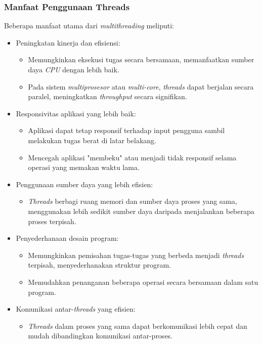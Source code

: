 \documentclass[12pt]{article}
\begin{document}
\subsubsection{Manfaat Penggunaan Threads}
Beberapa manfaat utama dari \textit{multithreading} meliputi:
\begin{itemize}
    \item Peningkatan kinerja dan efisiensi:
    \begin{itemize}
        \item Memungkinkan eksekusi tugas secara bersamaan, memanfaatkan sumber daya \textit{CPU} dengan lebih baik.
        \item Pada sistem \textit{multiprosesor} atau \textit{multi-core}, \textit{threads} dapat berjalan secara paralel, meningkatkan \textit{throughput} secara signifikan.
    \end{itemize}
    
    \item Responsivitas aplikasi yang lebih baik:
    \begin{itemize}
        \item Aplikasi dapat tetap responsif terhadap input pengguna sambil melakukan tugas berat di latar belakang.
        \item Mencegah aplikasi "membeku" atau menjadi tidak responsif selama operasi yang memakan waktu lama.
    \end{itemize}
    
    \item Penggunaan sumber daya yang lebih efisien:
    \begin{itemize}
        \item \textit{Threads} berbagi ruang memori dan sumber daya proses yang sama, menggunakan lebih sedikit sumber daya daripada menjalankan beberapa proses terpisah.
    \end{itemize}
    
    \item Penyederhanaan desain program:
    \begin{itemize}
        \item Memungkinkan pemisahan tugas-tugas yang berbeda menjadi \textit{threads} terpisah, menyederhanakan struktur program.
        \item Memudahkan penanganan beberapa operasi secara bersamaan dalam satu program.
    \end{itemize}
    
    \item Komunikasi antar-\textit{threads} yang efisien:
    \begin{itemize}
        \item \textit{Threads} dalam proses yang sama dapat berkomunikasi lebih cepat dan mudah dibandingkan komunikasi antar-proses.
    \end{itemize}
    

\end{itemize}
\end{document}
